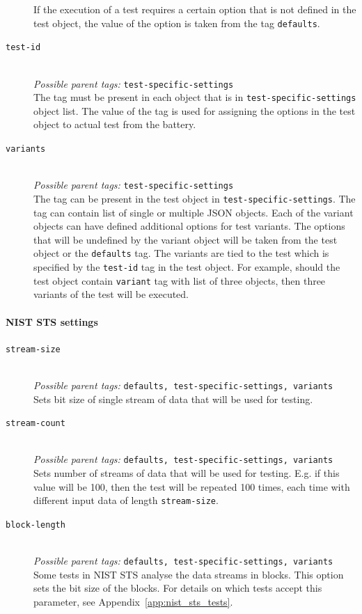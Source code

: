 \documentclass[
	digital,    %
	oneside,    %
	color,
	11pt,
	nocover,
	notable,
	nolof,
	nolot,
]{fithesis3}
\theoremstyle{definition}
\theoremstyle{remark}
\begin{document}
\begin{description}
If the execution of a test requires a certain option that is not defined in the test object, the value of the option is taken from the tag \texttt{defaults}.

\item[\texttt{test-id}] \hfill \\
\textit{Possible parent tags: } \texttt{test-specific-settings} \\
The tag must be present in each object that is in \texttt{test-specific-settings} object list. The value of the tag is used for assigning the options in the test object to actual test from the battery.

\item[\texttt{variants}] \hfill \\
\textit{Possible parent tags: } \texttt{test-specific-settings} \\
The tag can be present in the test object in \texttt{test-specific-settings}. The tag can contain list of single or multiple JSON objects. Each of the variant objects can have defined additional options for test variants. The options that will be undefined by the variant object will be taken from the test object or the \texttt{defaults} tag. The variants are tied to the test which is specified by the \texttt{test-id} tag in the test object. For example, should the test object contain \texttt{variant} tag with list of three objects, then three variants of the test will be executed.
\end{description}

\paragraph{NIST STS settings}

\begin{description}
\item[\texttt{stream-size}] \hfill \\
\textit{Possible parent tags: } \texttt{defaults, test-specific-settings, variants} \\
Sets bit size of single stream of data that will be used for testing.

\item[\texttt{stream-count}] \hfill \\
\textit{Possible parent tags: } \texttt{defaults, test-specific-settings, variants} \\
Sets number of streams of data that will be used for testing. E.g. if this value will be 100, then the test will be repeated 100 times, each time with different input data of length \texttt{stream-size}.

\item[\texttt{block-length}] \hfill \\
\textit{Possible parent tags: } \texttt{defaults, test-specific-settings, variants} \\
Some tests in NIST STS analyse the data streams in blocks. This option sets the bit size of the blocks. For details on which tests accept this parameter, see Appendix~\ref{app:nist_sts_tests}.

\end{description}
\end{document}
